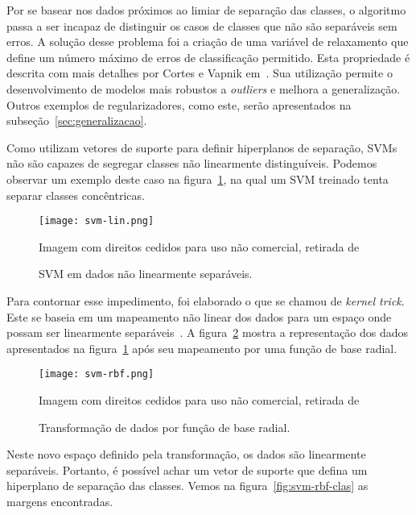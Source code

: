 Por se basear nos dados próximos ao limiar de separação das classes, o algoritmo passa a ser incapaz de distinguir os casos de classes que não são separáveis sem erros. A solução desse problema foi a criação de uma variável de relaxamento que define um número máximo de erros de classificação permitido. Esta propriedade é descrita com mais detalhes por Cortes e Vapnik em~\cite{cortes95}. Sua utilização permite o desenvolvimento de modelos mais robustos a \textit{outliers} e melhora a generalização. Outros exemplos de regularizadores, como este, serão apresentados na subseção~\ref{sec:generalizacao}.

Como utilizam vetores de suporte para definir hiperplanos de separação, SVMs não são capazes de segregar classes não linearmente distinguíveis. Podemos observar um exemplo deste caso na figura~\ref{fig:svm-lin}, na qual um SVM treinado tenta separar classes concêntricas.

\begin{figure}
\begin{center} {
    \begin{center}
    \texttt{[image: svm-lin.png]}
    \caption{SVM em dados não linearmente separáveis.}
    \small Imagem com direitos cedidos para uso não comercial, retirada de~\cite{vanderplas15}
    \label{fig:svm-lin}
    \end{center}
}
\end{center}
\end{figure}

Para contornar esse impedimento, foi elaborado o que se chamou de \textit{kernel trick}. Este se baseia em um mapeamento não linear dos dados para um espaço onde possam ser linearmente separáveis~\cite{scholkopf02}. A figura~\ref{fig:svm-rbf} mostra a representação dos dados apresentados na figura~\ref{fig:svm-lin} após seu mapeamento por uma função de base radial.

\begin{figure}
\begin{center} {
    \begin{center}
    \texttt{[image: svm-rbf.png]}
    \caption{Transformação de dados por função de base radial.}
    \small Imagem com direitos cedidos para uso não comercial, retirada de~\cite{vanderplas15}
    \label{fig:svm-rbf}
    \end{center}
}
\end{center}
\end{figure}

Neste novo espaço definido pela transformação, os dados são linearmente separáveis. Portanto, é possível achar um vetor de suporte que defina um hiperplano de separação das classes. Vemos na figura~\ref{fig:svm-rbf-clas} as margens encontradas.

